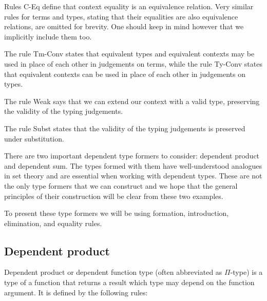 Rules C-Eq define that context equality is an equivalence relation. Very
similar rules for terms and types, stating that their equalities are also
equivalence relations, are omitted for brevity. One should keep in mind however
that we implicitly include them too.

The rule Tm-Conv states that equivalent types and equivalent contexts may be
used in place of each other in judgements on terms, while the rule Ty-Conv
states that equivalent contexts can be used in place of each other in
judgements on types.

The rule Weak says that we can extend our context with a valid type, preserving
the validity of the typing judgements.

The rule Subst states that the validity of the typing judgements is preserved
under substitution.

There are two important dependent type formers to consider: dependent product
and dependent sum. The types formed with them have well-understood analogues in
set theory and are essential when working with dependent types. These are not
the only type formers that we can construct and we hope that the general
principles of their construction will be clear from these two examples.

To present these type formers we will be using formation, introduction,
elimination, and equality rules.

\subsection*{Dependent product}

Dependent product or dependent function type (often abbreviated as $\Pi$-type)
is a type of a function that returns a result which type may depend on the
function argument. It is defined by the following rules:

